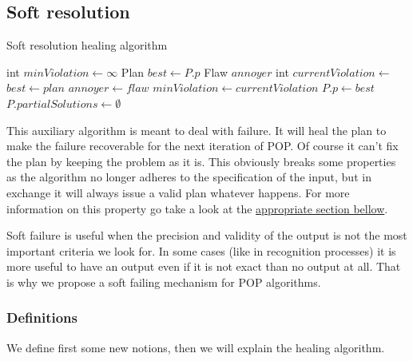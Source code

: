 \documentclass[]{article}
\begin{document}
\subsection{Soft resolution}\label{soft-resolution}

\begin{algorithm}\caption{Soft resolution healing algorithm}\label{softresolution}\begin{algorithmic}

 \State int \(minViolation \gets \infty\)
\State Plan \(best \gets P.p\) \State Flaw \(annoyer\)
 \State int
\(currentViolation \gets\) 
 \State \(best \gets plan\)
\State \(annoyer \gets flaw\)
\State \(minViolation \gets currentViolation\) \EndIf
    \EndFor
    \State \(P.p \gets best\)
\State \(P.partialSolutions \gets \emptyset\)
\State {} \EndFor
\EndFunction

\end{algorithmic}\end{algorithm}

This auxiliary algorithm is meant to deal with failure. It will heal the
plan to make the failure recoverable for the next iteration of POP. Of
course it can't fix the plan by keeping the problem as it is. This
obviously breaks some properties as the algorithm no longer adheres to
the specification of the input, but in exchange it will always issue a
valid plan whatever happens. For more information on this property go
take a look at the \protect\hyperlink{hypersoundness}{appropriate
section bellow}.

Soft failure is useful when the precision and validity of the output is
not the most important criteria we look for. In some cases (like in
recognition processes) it is more useful to have an output even if it is
not exact than no output at all. That is why we propose a soft failing
mechanism for POP algorithms.

\subsubsection{Definitions}\label{definitions-1}

We define first some new notions, then we will explain the healing
algorithm.
\end{document}
